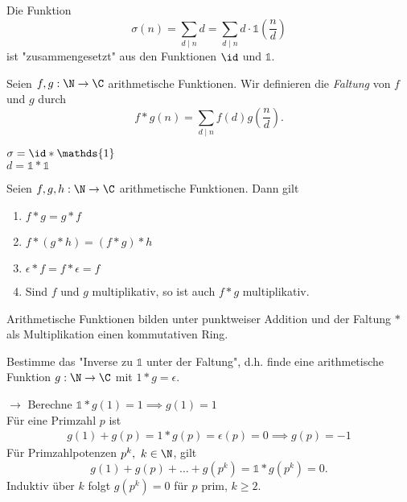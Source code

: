 \begin{obs*}
	Die Funktion
	\[ \sigma(n) = \sum_{d \mid n} d = \sum_{d \mid n} d \cdot \mathds{1} \left(\frac{n}{d}\right) \]
	ist "zusammengesetzt" aus den Funktionen $\id$ und $\mathds{1}$.
\end{obs*}

\begin{defn*}[Faltung]
	Seien $f,g: \N \to \C$ arithmetische Funktionen. Wir definieren die \emph{Faltung} von $f$ und $g$ durch
	\[ f * g(n) = \sum_{d \mid n} f(d) g\left(\frac{n}{d}\right). \]
\end{defn*}

\begin{exmp*}
	$\sigma = \id * \mathds{1}$\\$d = \mathds{1} * \mathds{1}$
\end{exmp*}

\begin{lem}\autolabel
	Seien $f,g,h: \N\to \C$ arithmetische Funktionen. Dann gilt
	\begin{enumerate}[label={\roman*})]
		\item $f * g = g * f$
		\item $f*(g*h) = (f*g)*h$
		\item $\epsilon * f = f * \epsilon = f$
		\item Sind $f$ und $g$ multiplikativ, so ist auch $f*g$ multiplikativ.
	\end{enumerate}
\end{lem}

\begin{rem*}
	Arithmetische Funktionen bilden unter punktweiser Addition und der Faltung $*$ als Multiplikation einen kommutativen Ring.
\end{rem*}

\begin{frage*}
	Bestimme das "Inverse zu $\mathds{1}$ unter der Faltung", d.h. finde eine arithmetische Funktion $g: \N \to \C$ mit $1 * g = \epsilon$.
\end{frage*}

$\to$ Berechne $\mathds{1} * g(1) = 1 \implies g(1) = 1$\\
Für eine Primzahl $p$ ist
\begin{align*}
	g(1) + g(p) = 1 * g(p) = \epsilon(p) = 0 \implies g(p) = -1
\end{align*}
Für Primzahlpotenzen $p^k,\ k \in \N$, gilt
\[ g(1) + g(p) + \dots + g(p^k) = \mathds{1} * g(p^k) = 0. \]
Induktiv über $k$ folgt $g(p^k)=0$ für $p$ prim, $k\geq 2$.

